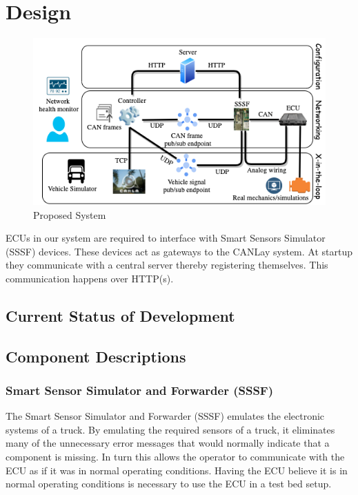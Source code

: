 \documentclass[letterpaper,twocolumn,12pt]{article}
\begin{document}
\section{Design}
\begin{figure}[t!]
    \centering
    \includegraphics[width=\linewidth]{images/system_design.drawio.png}
    \caption{Proposed System}
    \label{fig:goal}
\end{figure}
ECUs in our system are required to interface with Smart Sensors Simulator (SSSF) devices. These devices act as gateways to the CANLay system. At startup they communicate with a central server thereby registering themselves. This communication happens over HTTP(s). 

\subsection{Current Status of Development}

\subsection{Component Descriptions}
\subsubsection{Smart Sensor Simulator and Forwarder (SSSF)}
The Smart Sensor Simulator and Forwarder (SSSF) emulates the electronic systems of a truck. By emulating the required sensors of a truck, it eliminates many of the unnecessary error messages that would normally indicate that a component is missing. In turn this allows the operator to communicate with the ECU as if it was in normal operating conditions. Having the ECU believe it is in normal operating conditions is necessary to use the ECU in a test bed setup. 
\end{document}
